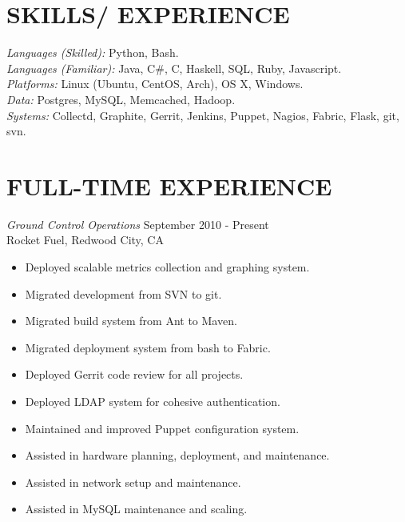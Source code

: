 \documentclass[line,margin]{res}
\begin{document}
\address{Sunnyvale, CA 94087}
\address{\sl tabletcorry@gmail.com}

\begin{resume}
 
\section{SKILLS/ EXPERIENCE} {\sl Languages (Skilled):} Python, Bash.\\
                {\sl Languages (Familiar):} Java, C\#, C, Haskell, SQL, Ruby, Javascript.\\
                {\sl Platforms:} Linux (Ubuntu, CentOS, Arch), OS X, Windows. \\
                {\sl Data:} Postgres, MySQL, Memcached, Hadoop. \\
                {\sl Systems:} Collectd, Graphite, Gerrit, Jenkins, Puppet, Nagios, Fabric, Flask, git, svn.
 
\section{FULL-TIME EXPERIENCE} 
                {\sl Ground Control Operations} \hfill September 2010 - Present \\
                Rocket Fuel, Redwood City, CA
                \begin{itemize}  \itemsep -2pt
                 \item Deployed scalable metrics collection and graphing system.
                 \item Migrated development from SVN to git.
                 \item Migrated build system from Ant to Maven.
                 \item Migrated deployment system from bash to Fabric.
                 \item Deployed Gerrit code review for all projects.
                 \item Deployed LDAP system for cohesive authentication.
                 \item Maintained and improved Puppet configuration system.
                 \item Assisted in hardware planning, deployment, and maintenance.
                 \item Assisted in network setup and maintenance.
                 \item Assisted in MySQL maintenance and scaling.
                \end{itemize}


\end{resume}
\end{document}
